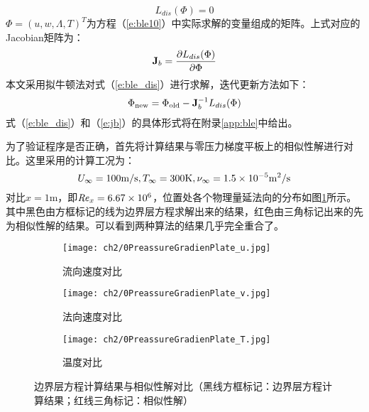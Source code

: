 \begin{equation}\label{e:ble_dis}
  L_{dis}(\Phi)=0
\end{equation}
$\Phi=(u,w,\Lambda,T)^T$为方程（\ref{e:ble10}）中实际求解的变量组成的矩阵。上式对应的Jacobian矩阵为：
\begin{equation}\label{e:jb}
  \mathbf{J}_b = \frac{\partial L_{dis}(\Phi)}{\partial \Phi}
\end{equation}
本文采用拟牛顿法对式（\ref{e:ble_dis}）进行求解，迭代更新方法如下：
\begin{equation}\label{e:ble_iter}
  \Phi_{\rm new} = \Phi_{\rm old} - \mathbf{J}_b^{-1}L_{dis}(\Phi)
\end{equation}
式（\ref{e:ble_dis}）和（\ref{e:jb}）的具体形式将在附录\ref{app:ble}中给出。

为了验证程序是否正确，首先将计算结果与零压力梯度平板上的相似性解进行对比。这里采用的计算工况为：
\begin{equation}
  U_\infty  = 100{\rm m/s},T_\infty  = 300{\rm K},\nu_\infty  = 1.5 \times 10^{ - 5} {\rm m^2 /s}
\end{equation}
对比$x=1$m，即$\mbox{{\textit{Re}}}_x=6.67\times10^6$，位置处各个物理量延法向的分布如图\ref{f:0PreassureGradienPlate}所示。其中黑色由方框标记的线为边界层方程求解出来的结果，红色由三角标记出来的先为相似性解的结果。可以看到两种算法的结果几乎完全重合了。
\begin{figure}[h]
  \centering%

  \begin{subfigure}{0.5\textwidth}
    \texttt{[image: ch2/0PreassureGradienPlate\_u.jpg]}
    \caption{流向速度对比}
  \end{subfigure}%
  \begin{subfigure}{0.5\textwidth}
    \texttt{[image: ch2/0PreassureGradienPlate\_v.jpg]}
    \caption{法向速度对比}
  \end{subfigure}%
  \bigskip

  \begin{subfigure}{0.5\textwidth}
    \texttt{[image: ch2/0PreassureGradienPlate\_T.jpg]}
    \caption{温度对比}
  \end{subfigure}%
  \caption{边界层方程计算结果与相似性解对比（黑线方框标记：边界层方程计算结果；红线三角标记：相似性解）}
  \label{f:0PreassureGradienPlate}
\end{figure}

